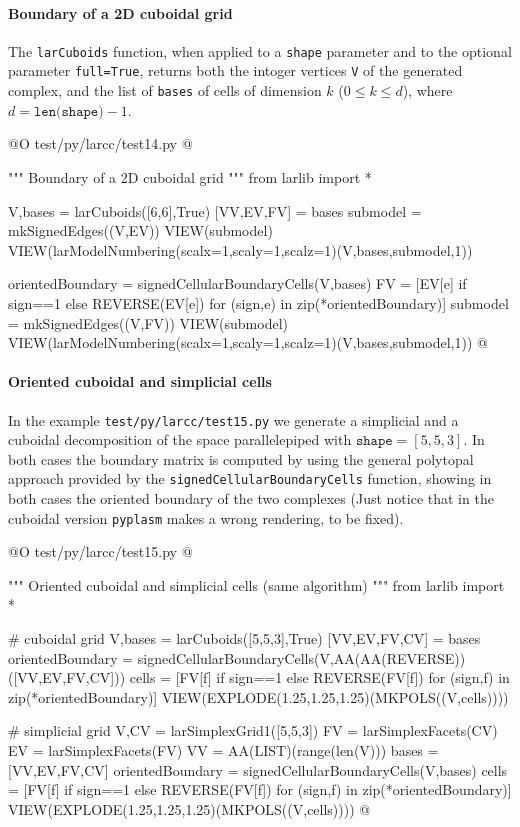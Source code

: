 \documentclass[11pt,oneside]{article}    %
\begin{document}
\paragraph{Boundary of a 2D cuboidal grid}
The \texttt{larCuboids} function, when applied to a \texttt{shape} parameter and to the optional parameter \texttt{full=True}, returns both the intoger vertices \texttt{V} of the generated complex, and the list of \texttt{bases} of cells of dimension $k$ ($0\leq k\leq d$), where $d = \texttt{len(shape)}-1$.

@O test/py/larcc/test14.py
@{""" Boundary of a 2D cuboidal grid """
from larlib import *

V,bases = larCuboids([6,6],True)
[VV,EV,FV] = bases
submodel = mkSignedEdges((V,EV))
VIEW(submodel)
VIEW(larModelNumbering(scalx=1,scaly=1,scalz=1)(V,bases,submodel,1))

orientedBoundary = signedCellularBoundaryCells(V,bases)
FV = [EV[e] if sign==1 else REVERSE(EV[e])  for (sign,e) in zip(*orientedBoundary)]
submodel = mkSignedEdges((V,FV))
VIEW(submodel)
VIEW(larModelNumbering(scalx=1,scaly=1,scalz=1)(V,bases,submodel,1))
@}

\paragraph{Oriented cuboidal and simplicial cells}
In the example \texttt{test/py/larcc/test15.py} we generate a simplicial and a cuboidal decomposition of the space parallelepiped with $\texttt{shape}=[5,5,3]$.
In both cases the boundary matrix is computed by using the general polytopal approach provided by the \texttt{signedCellularBoundaryCells} function, showing in both cases the oriented boundary of the two complexes
(Just notice that in the cuboidal version \texttt{pyplasm} makes a wrong rendering, to be fixed).

@O test/py/larcc/test15.py
@{""" Oriented cuboidal and simplicial cells (same algorithm) """
from larlib import *

# cuboidal grid
V,bases = larCuboids([5,5,3],True)
[VV,EV,FV,CV] = bases
orientedBoundary = signedCellularBoundaryCells(V,AA(AA(REVERSE))([VV,EV,FV,CV]))
cells = [FV[f] if sign==1 else REVERSE(FV[f])  for (sign,f) in zip(*orientedBoundary)]
VIEW(EXPLODE(1.25,1.25,1.25)(MKPOLS((V,cells))))

# simplicial grid
V,CV = larSimplexGrid1([5,5,3])
FV = larSimplexFacets(CV)
EV = larSimplexFacets(FV)
VV = AA(LIST)(range(len(V)))
bases = [VV,EV,FV,CV]
orientedBoundary = signedCellularBoundaryCells(V,bases)
cells = [FV[f] if sign==1 else REVERSE(FV[f])  for (sign,f) in zip(*orientedBoundary)]
VIEW(EXPLODE(1.25,1.25,1.25)(MKPOLS((V,cells))))
@}
\end{document}
